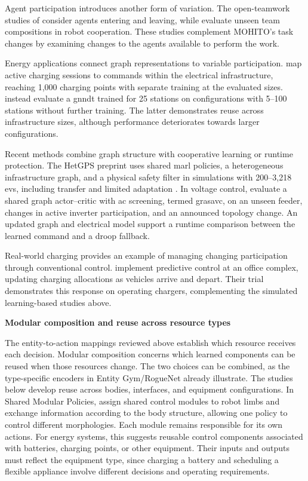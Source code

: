 Agent participation introduces another form of variation. The open-teamwork studies of \textcite{rahman2021gpl,koh2025flickerfusion} consider agents entering and leaving, while \textcite{cai2024comat} evaluate unseen team compositions in robot cooperation. These studies complement MOHITO's task changes by examining changes to the agents available to perform the work.

Energy applications connect graph representations to variable participation. \textcite{orfanoudakis2025evgnn} map active charging sessions to commands within the electrical infrastructure, reaching 1,000 charging points with separate training at the evaluated sizes. \textcite{orfanoudakis2026gnndt} instead evaluate a \gls{gnndt} trained for 25 stations on configurations with 5--100 stations without further training. The latter demonstrates reuse across infrastructure sizes, although performance deteriorates towards larger configurations.

Recent methods combine graph structure with cooperative learning or runtime protection. The HetGPS preprint uses shared \gls{marl} policies, a heterogeneous infrastructure graph, and a physical safety filter in simulations with 200--3,218 \glspl{ev}, including transfer and limited adaptation \parencite{wang2026hetgps}. In voltage control, \textcite{jin2026gras} evaluate a shared graph actor--critic with \gls{ac} screening, termed \gls{grasavc}, on an unseen feeder, changes in active inverter participation, and an announced topology change. An updated graph and electrical model support a runtime comparison between the learned command and a droop fallback.

Real-world charging provides an example of managing changing participation through conventional control. \textcite{hermans2024mpc} implement predictive control at an office complex, updating charging allocations as vehicles arrive and depart. Their trial demonstrates this response on operating chargers, complementing the simulated learning-based studies above.

\smallskip
\noindent\textbf{Modular composition and reuse across resource types}\par\nobreak\smallskip
The entity-to-action mappings reviewed above establish which resource receives each decision. Modular composition concerns which learned components can be reused when those resources change. The two choices can be combined, as the type-specific encoders in Entity Gym/RogueNet already illustrate. The studies below develop reuse across bodies, interfaces, and equipment configurations. In Shared Modular Policies, \textcite{huang2020smp} assign shared control modules to robot limbs and exchange information according to the body structure, allowing one policy to control different morphologies. Each module remains responsible for its own actions. For energy systems, this suggests reusable control components associated with batteries, charging points, or other equipment. Their inputs and outputs must reflect the equipment type, since charging a battery and scheduling a flexible appliance involve different decisions and operating requirements.

